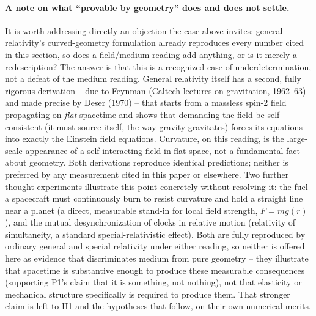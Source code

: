 \documentclass[12pt, a4paper]{article}
\begin{document}
\paragraph{A note on what ``provable by geometry'' does and does not
settle.} It is worth addressing directly an objection the case above
invites: general relativity's curved-geometry formulation already
reproduces every number cited in this section, so does a field/medium
reading add anything, or is it merely a redescription? The answer is
that this is a recognized case of underdetermination, not a defeat of
the medium reading. General relativity itself has a second, fully
rigorous derivation -- due to Feynman (Caltech lectures on
gravitation, 1962--63) and made precise by Deser (1970) -- that starts
from a massless spin-2 field propagating on \emph{flat} spacetime and
shows that demanding the field be self-consistent (it must source
itself, the way gravity gravitates) forces its equations into exactly
the Einstein field equations. Curvature, on this reading, is the
large-scale appearance of a self-interacting field in flat space, not
a fundamental fact about geometry. Both derivations reproduce
identical predictions; neither is preferred by any measurement cited
in this paper or elsewhere. Two further thought experiments
illustrate this point concretely without resolving it: the fuel a
spacecraft must continuously burn to resist curvature and hold a
straight line near a planet (a direct, measurable stand-in for local
field strength, $F=mg(r)$), and the mutual desynchronization of
clocks in relative motion (relativity of simultaneity, a standard
special-relativistic effect). Both are fully reproduced by ordinary
general and special relativity under either reading, so neither is
offered here as evidence that discriminates medium from pure
geometry -- they illustrate that spacetime is substantive enough to
produce these measurable consequences (supporting P1's claim that it
is something, not nothing), not that elasticity or mechanical
structure specifically is required to produce them. That stronger
claim is left to H1 and the hypotheses that follow, on their own
numerical merits.
\end{document}
